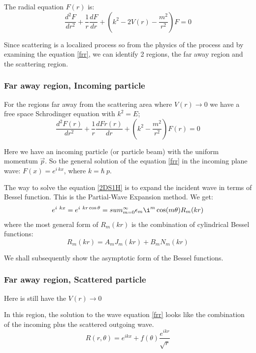 The radial equation $ F(r) $ is:
\begin{equation}\label{frr}
\frac{d^2 F}{dr^2} + \frac{1}{r}\frac{dF}{dr} + \left(k^2 - 2V(r) - \frac{m^2}{r^2}\right)F = 0
\end{equation}

Since scattering is a localized process so from the physics of the process and by examining the equation \eqref{frr},  we can identify 2 regions, the far away region and the scattering region.


\subsubsection{\textbf{Far away region, Incoming particle}}

For the regions far away from the scattering area where $ V(r) \rightarrow 0 $ we have a free space Schrodinger equation with $ k^2 = E $;
\begin{equation}\label{2DS1H}
\frac{d^2 F(r)}{dr^2} + \frac{1}{r}\frac{d Fr(r)}{dr} + \left(k^2 - \frac{m^2}{r^2}\right)F(r) = 0
\end{equation}
 
Here we have an incoming particle (or particle beam) with the uniform momentum $ \vec{p} $. So the general solution of the equation \eqref{frr} in the incoming plane wave: $  F(x) = e^{i\ kx} $, where $ k = \hbar\ p $.

The way to solve the equation \eqref{2DS1H} is to expand the incident wave in terms of Bessel function. This is the Partial-Wave Expansion method. We get:
\begin{equation}
    e^{i\ kx} = e^{i\ kr\cos\theta} = sum_{m=0}^{\infty}{\epsilon_m\i^m\cos(m\theta)R_m(kr)}
\end{equation}
where the most general form of $ R_m(kr) $ is the combination of cylindrical Bessel functions:
\begin{equation}\label{bss}
    R_m(kr) = A_mJ_m(kr) + B_mN_m(kr)
\end{equation}

We shall subsequently show the asymptotic form of the Bessel functions.

\subsubsection{\textbf{Far away region, Scattered particle}}

Here is still have the $ V(r) \rightarrow 0 $

In this region, the solution to the wave equation \eqref{frr} looks like the combination of the incoming plus the scattered outgoing wave.
\begin{equation}\label{free2D}
    R(r,\theta) = e^{ikx} + f(\theta)\frac{e^{ikr}}{\sqrt{r}}
\end{equation}

